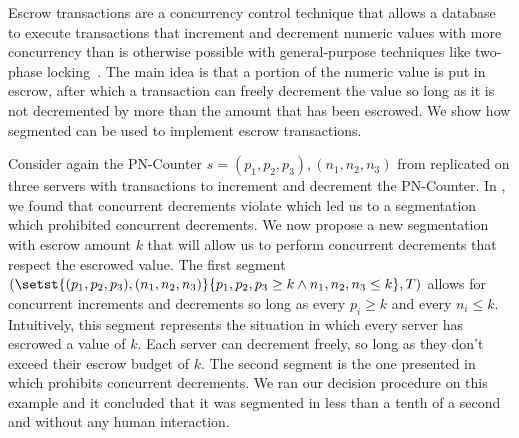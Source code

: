 Escrow transactions are a concurrency control technique that allows a database
to execute transactions that increment and decrement numeric values with more
concurrency than is otherwise possible with general-purpose techniques like
two-phase locking~\cite{o1986escrow}. The main idea is that a portion of the
numeric value is put in escrow, after which a transaction can freely decrement
the value so long as it is not decremented by more than the amount that has
been escrowed. We show how segmented \invariantconfluence{} can be used to
implement escrow transactions.

Consider again the PN-Counter $s = (p_1, p_2, p_3), (n_1, n_2, n_3)$ from
 replicated on three servers with transactions
to increment and decrement the PN-Counter. In
, we found that concurrent decrements violate
\invariantconfluence{} which led us to a segmentation which prohibited
concurrent decrements. We now propose a new segmentation with escrow amount $k$
that will allow us to perform concurrent decrements that respect the escrowed
value. The first segment $(\setst{(p_1, p_2, p_3), (n_1, n_2, n_3)}{p_1, p_2,
p_3 \geq k \land n_1, n_2, n_3 \leq k}, T)$ allows for concurrent increments
and decrements so long as every $p_i \geq k$ and every $n_i \leq k$.
Intuitively, this segment represents the situation in which every server has
escrowed a value of $k$. Each server can decrement freely, so long as they don't
exceed their escrow budget of $k$. The second segment is the one presented in
 which prohibits concurrent decrements. We ran
our decision procedure on this example and it concluded that it was segmented
\invariantconfluent{} in less than a tenth of a second and without any human
interaction.

